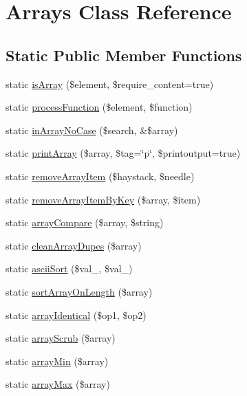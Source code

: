 \hypertarget{class_arrays}{\section{Arrays Class Reference}
\label{class_arrays}
}
\subsection*{Static Public Member Functions}
\begin{DoxyCompactItemize}
\item 
static \hyperlink{class_arrays_a9e2cdd67cbf16d41c830814017b2077b}{is\-Array} (\$element, \$require\-\_\-content=true)
\item 
static \hyperlink{class_arrays_ae1c1171efc438e64ced82a8cab03a997}{process\-Function} (\$element, \$function)
\item 
static \hyperlink{class_arrays_a9c2539de8710264477c087870d9f5a9d}{in\-Array\-No\-Case} (\$search, \&\$array)
\item 
static \hyperlink{class_arrays_ac9bf7f91563f5a7be1028049cf065631}{print\-Array} (\$array, \$tag=\char`\"{}p\char`\"{}, \$printoutput=true)
\item 
static \hyperlink{class_arrays_a3b8a88f53baa53b54c4a3faf582e41db}{remove\-Array\-Item} (\$haystack, \$needle)
\item 
static \hyperlink{class_arrays_a6deb22234510a197bf4a0df75ccf3cd0}{remove\-Array\-Item\-By\-Key} (\$array, \$item)
\item 
static \hyperlink{class_arrays_aa3d021a19de39106726d1eb056af1a31}{array\-Compare} (\$array, \$string)
\item 
static \hyperlink{class_arrays_ae95b4905eb00243bf4e54995a5d5b922}{clean\-Array\-Dupes} (\$array)
\item 
static \hyperlink{class_arrays_a3e70747933e8261b00a56b79af756de0}{ascii\-Sort} (\$val\-\_, \$val\-\_)
\item 
static \hyperlink{class_arrays_af02cb78875e4cd9c518bda580c076d46}{sort\-Array\-On\-Length} (\$array)
\item 
static \hyperlink{class_arrays_a88a86f63933b290f9ff4759a0d88b852}{array\-Identical} (\$op1, \$op2)
\item 
static \hyperlink{class_arrays_a6daa4bb59eb7c916cd773f247222ec12}{array\-Scrub} (\$array)
\item 
static \hyperlink{class_arrays_aa30cd3bc747cc82ed0601c064704b9ac}{array\-Min} (\$array)
\item 
static \hyperlink{class_arrays_a6c3a57512d10d848357c89384eb4d77a}{array\-Max} (\$array)

\end{DoxyCompactItemize}
